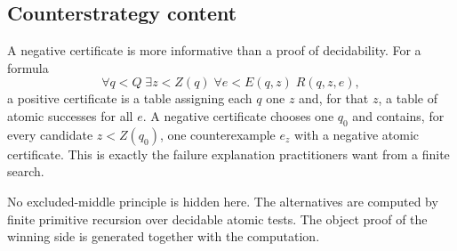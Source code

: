 \subsection{Counterstrategy content}

A negative certificate is more informative than a proof of decidability.
For a formula
\[
 \forall q<Q\;\exists z<Z(q)\;\forall e<E(q,z)\;R(q,z,e),
\]
a positive certificate is a table assigning each \(q\) one \(z\) and, for
that \(z\), a table of atomic successes for all \(e\).  A negative certificate
chooses one \(q_0\) and contains, for every candidate \(z<Z(q_0)\), one
counterexample \(e_z\) with a negative atomic certificate.  This is exactly the
failure explanation practitioners want from a finite search.

No excluded-middle principle is hidden here.  The alternatives are computed by
finite primitive recursion over decidable atomic tests.  The object proof of
the winning side is generated together with the computation.
